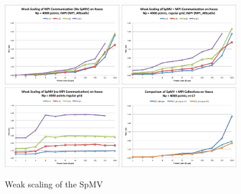 \documentclass{report}
\begin{document}
\begin{figure}
\centering
\includegraphics[width=0.45\textwidth]{performance_content/scaling/weak_scaling_np4000_regular_alltoallv_commOnly.png}
\includegraphics[width=0.45\textwidth]{performance_content/scaling/weak_scaling_np4000_regular_alltoallv.png}   \\
\includegraphics[width=0.45\textwidth]{performance_content/scaling/weak_scaling_np4000_regular_spmvOnly.png} 
\includegraphics[width=0.45\textwidth]{performance_content/scaling/weak_scaling_np4000_regular_n17_compare.png}
\caption{Weak scaling of the SpMV}
\end{figure}
\end{document}
